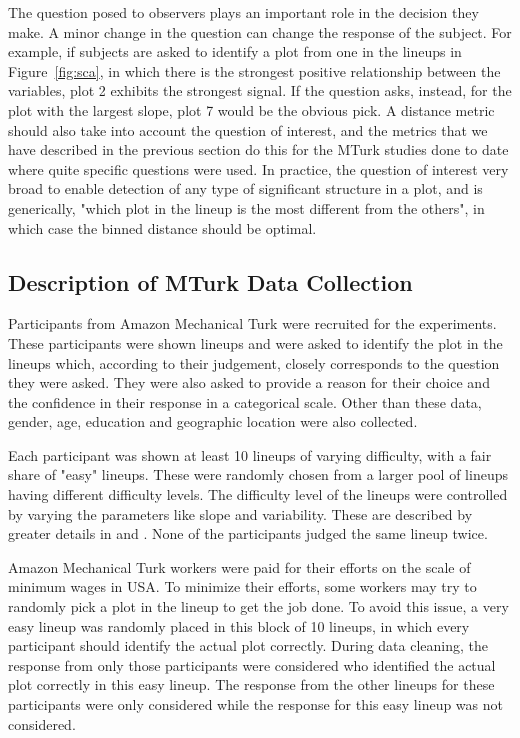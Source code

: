 \documentclass[12pt]{article}\usepackage[]{graphicx}\usepackage[]{color}
\newcommand{\hh}[1]{{\color{magenta} #1}}
\newcommand{\dc}[1]{{\color{orange} #1}}
\begin{document}
The question posed to observers plays an important role in the decision they make. A minor change in the question can change the response of the subject. For example, if subjects are asked to identify a plot from one in the lineups in Figure~\ref{fig:sca}, in which there is the strongest positive relationship between the variables, plot 2 exhibits the strongest signal.  If the question asks, instead, for the plot with the largest slope, plot 7 would be the obvious pick. 
A distance metric should also take into account the question of interest, and the metrics that we have described in the previous section do this for the MTurk studies done to date where quite specific questions were used. In practice, the question of interest very broad to enable detection of any type of significant structure in a plot, and is generically, "which plot in the lineup is the most different from the others", in which case the binned distance should be optimal.

\subsection*{Description of MTurk Data Collection}

Participants from Amazon Mechanical Turk were recruited for the experiments. These participants were shown lineups and were asked to identify the plot in the lineups which, according to their judgement, closely corresponds to the question they were asked. They were also asked to provide a reason for their choice and the confidence in their response in a categorical scale. Other than these data, gender, age, education and geographic location were also collected.

Each participant was shown at least 10 lineups of varying difficulty, with a fair share of "easy" lineups. These were randomly chosen from a larger pool of lineups having different difficulty levels. The difficulty level of the lineups were controlled by varying the parameters like slope and variability. These are described by greater details in \citet{majumder:2011} and \citep{roychowdhury:2013}. None of the participants judged the same lineup twice. 

Amazon Mechanical Turk workers were paid for their efforts on the scale of minimum wages in USA. To minimize their efforts, some workers may try to randomly pick a plot in the lineup to get the job done. To avoid this issue, a very easy lineup was randomly placed in this block of 10 lineups, in which every participant should identify the actual plot correctly. During data cleaning, the response from only those participants were considered who identified the actual plot correctly in this easy lineup. The response from the other lineups for these participants were only considered while the response for this easy lineup was not considered. 
\end{document}
